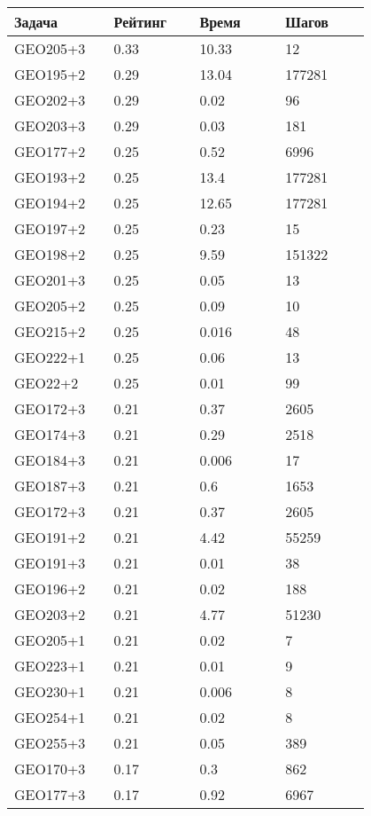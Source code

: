 \begin{longtable}[H]{|p{0.2\linewidth}|p{0.2\linewidth}|p{0.2\linewidth}|p{0.2\linewidth}|}
\hline
\textbf{Задача} & \textbf{Рейтинг} & \textbf{Время} & \textbf{Шагов} \\
\hline
GEO205+3 & 0.33 & 10.33 & 12 \\
\hline
GEO195+2 & 0.29 & 13.04 & 177281 \\
\hline
GEO202+3 & 0.29 & 0.02 & 96 \\
\hline
GEO203+3 & 0.29 & 0.03 & 181 \\
\hline
GEO177+2 & 0.25 & 0.52 & 6996 \\
\hline
GEO193+2 & 0.25 & 13.4 & 177281 \\
\hline
GEO194+2 & 0.25 & 12.65 & 177281 \\
\hline
GEO197+2 & 0.25 & 0.23 & 15 \\
\hline
GEO198+2 & 0.25 & 9.59 & 151322 \\
\hline
GEO201+3 & 0.25 & 0.05 & 13 \\
\hline
GEO205+2 & 0.25 & 0.09 & 10 \\
\hline
GEO215+2 & 0.25 & 0.016 & 48 \\
\hline
GEO222+1 & 0.25 & 0.06 & 13 \\
\hline
GEO22+2 & 0.25 & 0.01 & 99 \\
\hline
GEO172+3 & 0.21 & 0.37 & 2605 \\
\hline
GEO174+3 & 0.21 & 0.29 & 2518 \\
\hline
GEO184+3 & 0.21 & 0.006 & 17 \\
\hline
GEO187+3 & 0.21 & 0.6 & 1653 \\
\hline
GEO172+3 & 0.21 & 0.37 & 2605 \\
\hline
GEO191+2 & 0.21 & 4.42 & 55259 \\
\hline
GEO191+3 & 0.21 & 0.01 & 38 \\
\hline
GEO196+2 & 0.21 & 0.02 & 188 \\
\hline
GEO203+2 & 0.21 & 4.77 & 51230 \\
\hline
GEO205+1 & 0.21 & 0.02 & 7 \\
\hline
GEO223+1 & 0.21 & 0.01 & 9 \\
\hline
GEO230+1 & 0.21 & 0.006 & 8 \\
\hline
GEO254+1 & 0.21 & 0.02 & 8 \\
\hline
GEO255+3 & 0.21 & 0.05 & 389 \\
\hline
GEO170+3 & 0.17 & 0.3 & 862 \\
\hline
GEO177+3 & 0.17 & 0.92 & 6967 \\

\end{longtable}
